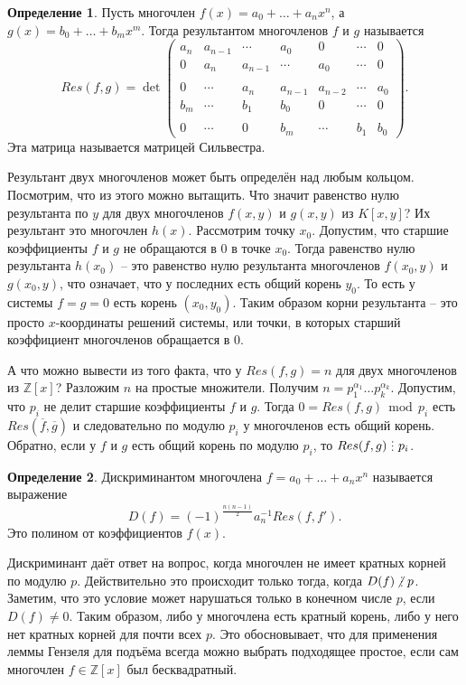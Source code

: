 \documentclass[10pt,a4paper,oneside]{book}
\theoremstyle{definition}
\newtheorem*{defn}{\color{yellow!30!red} Определение}
\renewcommand{\mod}{\,\operatorname{mod}\,}
\newcommand{\mb}[1]{\mathbb{#1}}
\newcommand{\ovl}{\overline}
\newcommand{\di}{\mathop{\,\scalebox{0.85}{\raisebox{-1.2pt}[0.5\height]{\vdots}}\,}}
\newcommand{\ndi}{\mathop{\not\scalebox{0.85}{\raisebox{-1.2pt}[0.5\height]{\vdots}}\,}}
\def\dfn{\begin{defn}}
\def\edfn{\end{defn}}
\begin{document}
\dfn Пусть многочлен $f(x)=a_0+\dots+a_nx^n$, а $g(x)=b_0+\dots+b_mx^m$. Тогда результантом многочленов $f$ и $g$ называется $$Res(f,g)=  \det 
\begin{pmatrix}
a_n & a_{n-1} & \cdots & a_0 & 0 & \cdots & 0 \\
0 & a_n & a_{n-1} & \cdots & a_0 & \cdots & 0 \\
\\
0 & \cdots &  a_n & a_{n-1} & a_{n-2} & \cdots &  a_0 \\
b_m & \cdots & b_1 & b_0 & 0 & \cdots & 0 \\
 \\
0 & \cdots & 0 & b_m & \cdots & b_1 & b_0 
\end{pmatrix}.$$
Эта матрица называется матрицей Сильвестра. 
\edfn

Результант двух многочленов может быть определён над любым кольцом. Посмотрим, что из этого можно вытащить. Что значит равенство нулю результанта по $y$ для двух многочленов $f(x,y) $ и $g(x,y)$ из $K[x,y]$? Их результант это многочлен $h(x)$. Рассмотрим точку $x_0$. Допустим, что старшие коэффициенты $f$ и $g$ не обращаются в 0 в точке $x_0$. Тогда равенство нулю результанта $h(x_0)$ -- это равенство нулю результанта многочленов $f(x_0,y)$ и $g(x_0,y)$, что означает, что у последних есть общий корень $y_0$. То есть у системы $f=g=0$ есть корень $(x_0,y_0)$. Таким образом корни результанта -- это  просто $x$-координаты решений системы, или точки, в которых старший коэффициент многочленов обращается в 0.


А что можно вывести из того факта, что у $Res(f,g)=n$ для двух многочленов из $\mb Z[x]$? Разложим $n$ на простые множители. Получим $n=p_1^{\alpha_1} \dots p_k^{\alpha_k}$. Допустим, что $p_i$ не делит старшие коэффициенты $f$ и $g$. Тогда $0=Res(f,g) \mod p_i $ есть $Res(\ovl{f}, \ovl{g})$ и следовательно по модулю $p_i$ у многочленов есть общий корень. Обратно, если у $f$ и $g$ есть общий корень по модулю $p_i$, то $Res(f,g)\di p_i$.

\dfn Дискриминантом многочлена $f=a_0+\dots +a_nx^n$ называется выражение 
$$D(f)=(-1)^{\frac{n(n-1)}{2}} a_n^{-1} Res(f,f').$$
Это полином от коэффициентов $f(x)$.
\edfn

Дискриминант даёт ответ на вопрос, когда многочлен не имеет кратных корней по модулю $p$. Действительно это происходит только тогда, когда $D(f)\ndi p$. Заметим, что это условие может нарушаться только в конечном числе $p$, если $D(f)\neq 0$. Таким образом, либо у многочлена есть кратный корень, либо у него нет кратных корней для почти всех $p$. Это обосновывает, что для применения леммы Гензеля для подъёма всегда можно выбрать подходящее простое, если сам многочлен $f\in \mb Z[x]$ был бесквадратный.
\end{document}
